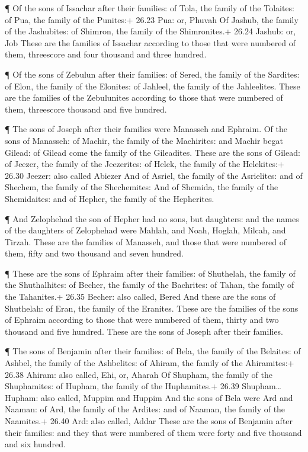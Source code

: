  ¶ Of the sons of Issachar after their families: of Tola,
the family of the Tolaites: of Pua, the family of the Punites:+ 26.23
Pua: or, Phuvah  Of Jashub, the family of the Jashubites:
of Shimron, the family of the Shimronites.+ 26.24 Jashub: or, Job
 These are the families of Issachar according to those that
were numbered of them, threescore and four thousand and three hundred.

 ¶ Of the sons of Zebulun after their families: of Sered,
the family of the Sardites: of Elon, the family of the Elonites: of
Jahleel, the family of the Jahleelites.  These are the
families of the Zebulunites according to those that were numbered of
them, threescore thousand and five hundred.

 ¶ The sons of Joseph after their families were Manasseh
and Ephraim.  Of the sons of Manasseh: of Machir, the
family of the Machirites: and Machir begat Gilead: of Gilead come the
family of the Gileadites.  These are the sons of Gilead: of
Jeezer, the family of the Jeezerites: of Helek, the family of the
Helekites:+ 26.30 Jeezer: also called Abiezer  And of
Asriel, the family of the Asrielites: and of Shechem, the family of the
Shechemites:  And of Shemida, the family of the
Shemidaites: and of Hepher, the family of the Hepherites.

 ¶ And Zelophehad the son of Hepher had no sons, but
daughters: and the names of the daughters of Zelophehad were Mahlah, and
Noah, Hoglah, Milcah, and Tirzah.  These are the families
of Manasseh, and those that were numbered of them, fifty and two
thousand and seven hundred.

 ¶ These are the sons of Ephraim after their families: of
Shuthelah, the family of the Shuthalhites: of Becher, the family of the
Bachrites: of Tahan, the family of the Tahanites.+ 26.35 Becher: also
called, Bered  And these are the sons of Shuthelah: of
Eran, the family of the Eranites.  These are the families
of the sons of Ephraim according to those that were numbered of them,
thirty and two thousand and five hundred. These are the sons of Joseph
after their families.

 ¶ The sons of Benjamin after their families: of Bela, the
family of the Belaites: of Ashbel, the family of the Ashbelites: of
Ahiram, the family of the Ahiramites:+ 26.38 Ahiram: also called, Ehi,
or, Aharah  Of Shupham, the family of the Shuphamites: of
Hupham, the family of the Huphamites.+ 26.39 Shupham\ldots Hupham: also
called, Muppim and Huppim  And the sons of Bela were Ard
and Naaman: of Ard, the family of the Ardites: and of Naaman, the family
of the Naamites.+ 26.40 Ard: also called, Addar  These are
the sons of Benjamin after their families: and they that were numbered
of them were forty and five thousand and six hundred.

